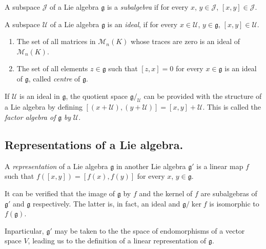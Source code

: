 \begin{defi*}%
 A subspace $\mathscr{J}$ of a Lie algebra $\mathfrak{g}$ is a {\em
   subalgebra} if for every $x$, $y \in \mathscr{J}$, $[x,y]\in
 \mathscr{J}$. 
\end{defi*}
 
A subspace $\mathcal{U}$ of a Lie algebra $\mathfrak{g}$ is an
 \textit{ideal}, if for every $x \in \mathcal{U}$, $y \in
 \mathfrak{g}$, $[x, y]\in  \mathcal{U}$. 

\begin{examples*}
\begin{enumerate}
\renewcommand{\labelenumi}{(\theenumi)}
\item The set of all matrices in $\mathscr{M}_n(K)$ whose traces are
  zero is an ideal of $\mathscr{M}_n(K)$. 

\item The set of all elements $z \in \mathfrak{g}$ such that $[z, x]=0$
  for every $x \in \mathfrak{g}$ is an ideal of $\mathfrak{g}$, called
  \textit{centre} of $\mathfrak{g}$.  
\end{enumerate}
\end{examples*}

If $\mathcal{U}$ is an ideal in $\mathfrak{g}$, the quotient space
$\mathfrak{g}/_{\mathcal{U}}$ can be provided with the structure of a
Lie algebra by defining $[(x+\mathcal{U}),(y+\mathcal{U})]=[x,
  y]+\mathcal{U}$. This is called the \textit{factor algebra of}
$\mathfrak{g}$ \textit{by} $\mathcal{U}$. 

\subsection{Representations of a Lie algebra.}\label{chap2-sec2.7}%

\begin{defi*}%
 A {\em representation} of a Lie algebra $\mathfrak{g}$ in another Lie
 algebra $\mathfrak{g}'$ is a linear map $f$ such that $f([x,
   y])=[f(x), f(y)]$ for every $x$, $y \in \mathfrak{g}$.  
\end{defi*}

It can be verified that the image of $\mathfrak{g}$ by $f$ and the
kernel of $f$ are subalgebras of $\mathfrak{g}'$ and $\mathfrak{g}$
respectively. The latter is, in fact, an ideal and $\mathfrak{g}/ \ker
f$ is isomorphic to $f(\mathfrak{g})$. 

In\pageoriginale particular, $\mathfrak{g}'$ may be taken to the the space of
endomorphisms of a vector space $V$, leading us to the definition of
a linear representation of $\mathfrak{g}$. 

